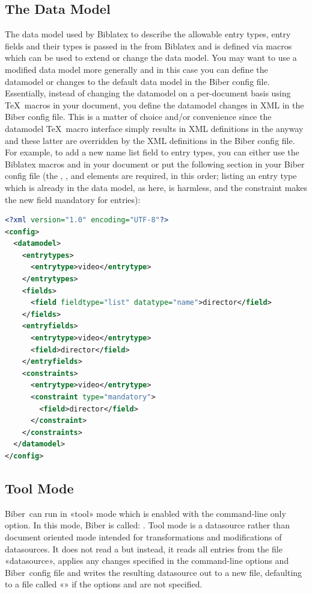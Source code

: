 \documentclass{ltxdockit}
\newcommand*{\biber}{Biber\xspace}
\newcommand*{\biblatex}{Biblatex\xspace}
\begin{document}
\subsection{The Data Model}\label{ref:datamodel}
The data model used by \biblatex to describe the allowable entry types,
entry fields and their types is passed in the  from \biblatex
and is defined via macros which can be used to extend or change the data
model. You may want to use a modified data model more generally and in this
case you can define the datamodel or changes to the default data model in
the \biber config file. Essentially, instead of changing the datamodel on a
per-document basis using \TeX\ macros in your document, you define the
datamodel changes in XML in the \biber config file. This is a matter of
choice and/or convenience since the datamodel \TeX\ macro interface simply
results in XML definitions in the  anyway and these latter are
overridden by the XML definitions in the \biber config file. For example, to
add a new name list field  to  entry
types, you can either use the \biblatex macros 
and  in your document or put the following
 section in your \biber config file (the ,
,  and  elements are required,
in this order; listing an entry type which is already in the data model, as
here, is harmless, and the constraint makes the new field mandatory for
 entries):
\begin{lstlisting}[language=xml]
<?xml version="1.0" encoding="UTF-8"?>
<config>
  <datamodel>
    <entrytypes>
      <entrytype>video</entrytype>
    </entrytypes>
    <fields>
      <field fieldtype="list" datatype="name">director</field>
    </fields>
    <entryfields>
      <entrytype>video</entrytype>
      <field>director</field>
    </entryfields>
    <constraints>
      <entrytype>video</entrytype>
      <constraint type="mandatory">
        <field>director</field>
      </constraint>
    </constraints>
  </datamodel>
</config>
\end{lstlisting}
\bigskip
\subsection{Tool Mode}\label{ref:tool}
\biber\ can run in «tool» mode which is enabled with the 
command-line only option. In this mode, \biber is called: . Tool mode is a datasource rather than document oriented
mode intended for transformations and modifications of datasources. It does
not read a  but instead, it reads all entries from the file
«datasource», applies any changes specified in the command-line options and
\biber\ config file and writes the resulting datasource out to a new file,
defaulting to a \bibtex file called «» if
the options  and  are not specified.
\end{document}
